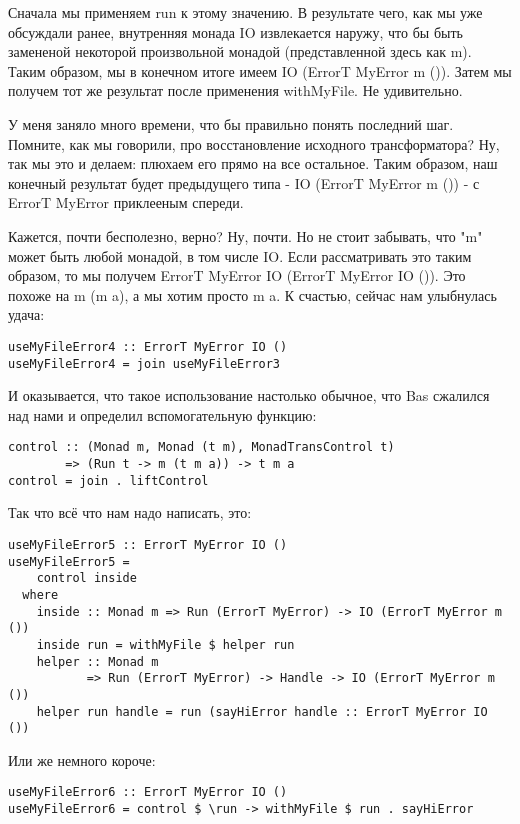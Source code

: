 Сначала мы применяем run к этому значению. В результате чего, как мы уже обсуждали ранее, внутренняя монада IO извлекается наружу, что бы быть замененой некоторой произвольной монадой (представленной здесь как m). Таким образом, мы в конечном итоге имеем IO (ErrorT MyError m ()). Затем мы получем тот же результат после применения withMyFile. Не удивительно.

У меня заняло много времени, что бы правильно понять последний шаг. Помните, как мы говорили, про восстановление исходного трансформатора? Ну, так мы это и делаем: плюхаем его прямо на все остальное. Таким образом, наш конечный результат будет предыдущего типа - IO (ErrorT MyError m ()) - с ErrorT MyError приклееным спереди.

Кажется, почти бесполезно, верно? Ну, почти. Но не стоит забывать, что "m" может быть любой монадой, в том числе IO. Если рассматривать это таким образом, то мы получем ErrorT MyError IO (ErrorT MyError IO ()). Это похоже на m (m a), а мы хотим просто m a. К счастью, сейчас нам улыбнулась удача:

\begin{lstlisting}
useMyFileError4 :: ErrorT MyError IO ()
useMyFileError4 = join useMyFileError3
\end{lstlisting}

И оказывается, что такое использование настолько обычное, что Bas сжалился над нами и определил вспомогательную функцию:

\begin{lstlisting}
control :: (Monad m, Monad (t m), MonadTransControl t)
        => (Run t -> m (t m a)) -> t m a
control = join . liftControl
\end{lstlisting}

Так что всё что нам надо написать, это:

\begin{lstlisting}
useMyFileError5 :: ErrorT MyError IO ()
useMyFileError5 =
    control inside
  where
    inside :: Monad m => Run (ErrorT MyError) -> IO (ErrorT MyError m ())
    inside run = withMyFile $ helper run
    helper :: Monad m
           => Run (ErrorT MyError) -> Handle -> IO (ErrorT MyError m ())
    helper run handle = run (sayHiError handle :: ErrorT MyError IO ())
\end{lstlisting}

Или же немного короче:

\begin{lstlisting}
useMyFileError6 :: ErrorT MyError IO ()
useMyFileError6 = control $ \run -> withMyFile $ run . sayHiError
\end{lstlisting}

